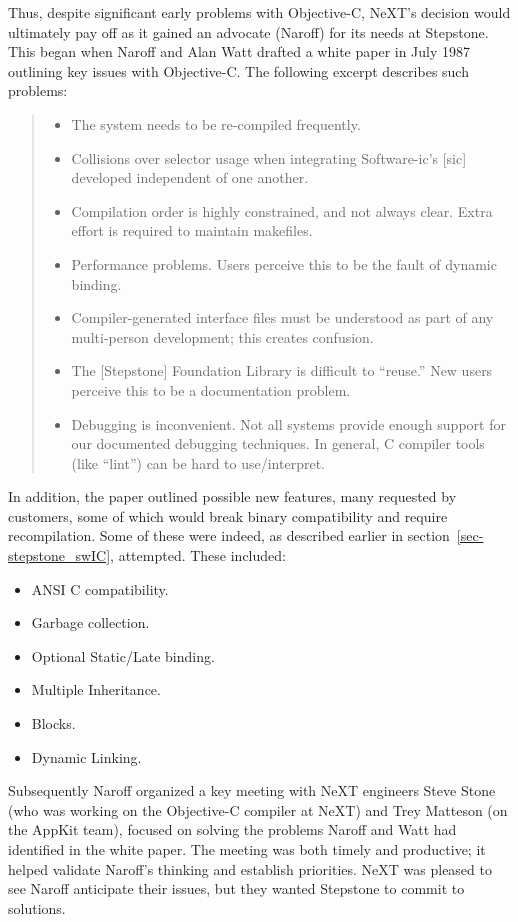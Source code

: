 \documentclass[acmsmall]{acmart}\settopmatter{}
\begin{document}
Thus, despite significant early problems with Objective-C, NeXT's decision would ultimately pay off as it gained an advocate (Naroff) for its needs at Stepstone. This began when Naroff and Alan Watt drafted a white paper in July 1987 outlining key issues with Objective-C. The following excerpt describes such problems:
\begin{quotation}
\begin{itemize}
\item The system needs to be re-compiled frequently.
\item Collisions over selector usage when integrating Software-ic's [sic] developed independent of one another.
\item Compilation order is highly constrained, and not always clear. Extra effort is required to maintain makefiles.
\item Performance problems. Users perceive this to be the fault of dynamic binding.
\item Compiler-generated interface files must be understood as part of any multi-person development; this creates confusion.
\item The [Stepstone] Foundation Library is difficult to ``reuse.'' New users perceive this to be a documentation problem.
\item Debugging is inconvenient. Not all systems provide enough support for our documented debugging techniques. In general, C compiler tools (like ``lint'') can be hard to use/interpret. \citep[2]{naroff_design_1987}
\end{itemize}
\end{quotation}
In addition, the paper outlined possible new features, many requested by customers, some of which would break binary compatibility and require recompilation. Some of these were indeed, as described earlier in section~\ref{sec-stepstone_swIC}, attempted. These included:
\begin{itemize}
\item ANSI C compatibility.
\item Garbage collection.
\item Optional Static/Late binding.
\item Multiple Inheritance.
\item Blocks.
\item Dynamic Linking. \citep[5--9]{naroff_design_1987}
\end{itemize}
Subsequently Naroff organized a key meeting with NeXT engineers Steve Stone (who was working on the Objective-C compiler at NeXT) and Trey Matteson (on the AppKit team), focused on solving the problems Naroff and Watt had identified in the white paper. The meeting was both timely and productive; it helped validate Naroff's thinking and establish priorities. NeXT was pleased to see Naroff anticipate their issues, but they wanted Stepstone to commit to solutions.
\end{document}
